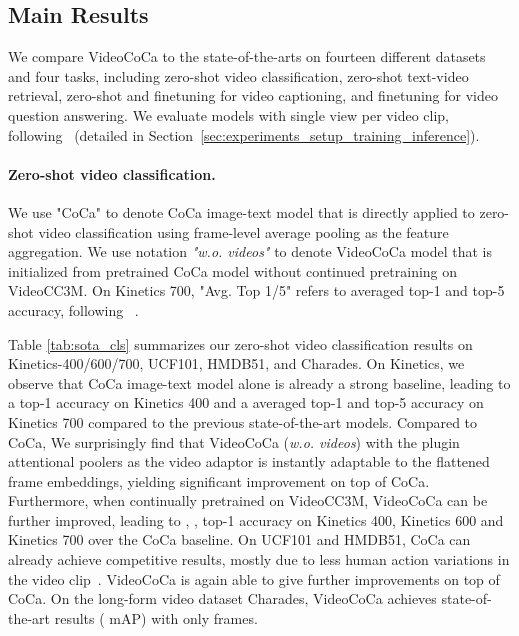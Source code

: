 \subsection{Main Results}
\label{sec:experiments_sota}
We compare VideoCoCa to the state-of-the-arts on fourteen different datasets and four tasks, including zero-shot video classification, zero-shot text-video retrieval, zero-shot and finetuning for video captioning, and finetuning for video question answering. We evaluate models with single view per video clip, following~\cite{ni2022XCLIP} (detailed in Section~\ref{sec:experiments_setup_training_inference}).


\vspace{-1\baselineskip}
\paragraph{Zero-shot video classification.}



We use "CoCa" to denote CoCa image-text model that is directly applied to zero-shot video classification using frame-level average pooling as the feature aggregation. We use notation \textit{"w.o. videos"} to denote VideoCoCa model that is initialized from pretrained CoCa model without continued pretraining on VideoCC3M. On Kinetics 700, "Avg. Top 1/5" refers to averaged top-1 and top-5 accuracy, following ~\cite{alayrac2022flamingo}. 

Table \ref{tab:sota_cls} summarizes our zero-shot video classification results on Kinetics-400/600/700, UCF101, HMDB51, and Charades. On Kinetics, we observe that CoCa image-text model alone is already a strong baseline, leading to a   top-1 accuracy on Kinetics 400 and a  averaged top-1 and top-5 accuracy on Kinetics 700 compared to the previous state-of-the-art models. Compared to CoCa, We surprisingly find that VideoCoCa (\textit{w.o. videos}) with the plugin attentional poolers as the video adaptor is instantly adaptable to the flattened frame embeddings, yielding significant improvement on top of CoCa. Furthermore, when continually pretrained on VideoCC3M, VideoCoCa can be further improved, leading to , ,  top-1 accuracy on Kinetics 400, Kinetics 600 and Kinetics 700 over the CoCa baseline. On UCF101 and HMDB51, CoCa can already achieve competitive results, mostly due to less human action variations in the video clip~\cite{kay_arxiv_2017}. VideoCoCa is again able to give further improvements on top of CoCa. On the long-form video dataset Charades, VideoCoCa achieves state-of-the-art results ( mAP) with only  frames.



